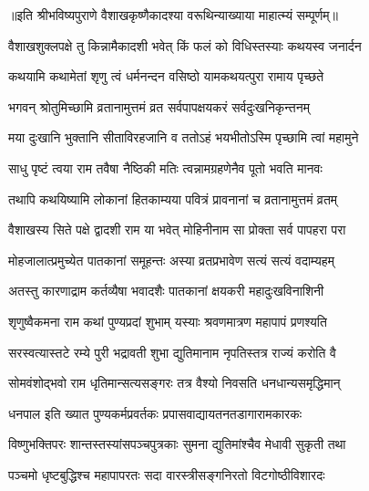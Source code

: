 ॥इति श्रीभविष्यपुराणे वैशाखकृष्णैकादश्या वरूथिन्याख्याया माहात्म्यं सम्पूर्णम्॥


\hyperref[sec:ekadashi_mahatmyam_vrata_raja]{\closesub}
\clearpage

\label{sec:vrata-raja-vaishakha-shukla-mohini}


\twolineshloka
{वैशाखशुक्लपक्षे तु किन्नामैकादशी भवेत्}
{किं फलं को विधिस्तस्याः कथयस्व जनार्दन} %


\twolineshloka
{कथयामि कथामेतां शृणु त्वं धर्मनन्दन}
{वसिष्ठो यामकथयत्पुरा रामाय पृच्छते} %


\twolineshloka
{भगवन् श्रोतुमिच्छामि व्रतानामुत्तमं व्रत}
{सर्वपापक्षयकरं सर्वदुःखनिकृन्तनम्} %

\twolineshloka
{मया दुःखानि भुक्तानि सीताविरहजानि व}
{ततोऽहं भयभीतोऽस्मि पृच्छामि त्वां महामुने} %


\twolineshloka
{साधु पृष्टं त्वया राम तवैषा नैष्ठिकी मतिः}
{त्वन्नामग्रहणेनैव पूतो भवति मानवः} %

\twolineshloka
{तथापि कथयिष्यामि लोकानां हितकाम्यया}
{पवित्रं प्रावनानां च व्रतानामुत्तमं व्रतम्} %

\twolineshloka
{वैशाखस्य सिते पक्षे द्वादशी राम या भवेत्}
{मोहिनीनाम सा प्रोक्ता सर्व पापहरा परा} %

\twolineshloka
{मोहजालात्प्रमुच्येत पातकानां समूहन्तः}
{अस्या व्रतप्रभावेण सत्यं सत्यं वदाम्यहम्} %

\twolineshloka
{अतस्तु कारणाद्राम कर्तव्यैषा भवादशैः}
{पातकानां क्षयकरी महादुःखविनाशिनी} %

\twolineshloka
{शृणुष्वैकमना राम कथां पुण्यप्रदां शुभाम्}
{यस्याः श्रवणमात्रण महापापं प्रणश्यति} %

\twolineshloka
{सरस्वत्यास्तटे रम्ये पुरी भद्रावती शुभा}
{द्युतिमानाम नृपतिस्तत्र राज्यं करोति वै} %

\twolineshloka
{सोमवंशोद्भवो राम धृतिमान्सत्यसङ्गरः}
{तत्र वैश्यो निवसति धनधान्यसमृद्धिमान्} %

\twolineshloka
{धनपाल इति ख्यात पुण्यकर्मप्रवर्तकः}
{प्रपासवाद्यायतनतडागारामकारकः} %

\twolineshloka
{विष्णुभक्तिपरः शान्तस्तस्यांसपञ्चपुत्रकाः}
{सुमना द्युतिमांश्चैव मेधावी सुकृती तथा} %

\twolineshloka
{पञ्चमो धृष्टबुद्धिश्च महापापरतः सदा}
{वारस्त्रीसङ्गनिरतो विटगोष्ठीविशारदः} %

